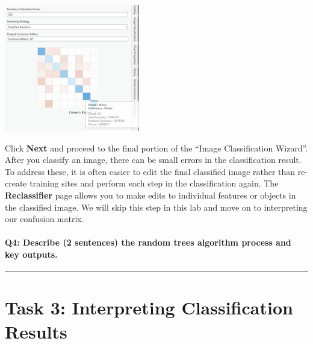 \documentclass[
]{book}
\begin{document}
\begin{center}\includegraphics[width=0.5\linewidth]{images/08-confusion-matrix} \end{center}

Click \textbf{Next} and proceed to the final portion of the ``Image Classification Wizard''. After you classify an image, there can be small errors in the classification result. To address these, it is often easier to edit the final classified image rather than re-create training sites and perform each step in the classification again. The \textbf{Reclassifier} page allows you to make edits to individual features or objects in the classified image. We will skip this step in this lab and move on to interpreting our confusion matrix.

\hypertarget{q4-describe-2-sentences-the-random-trees-algorithm-process-and-key-outputs.}{%
\paragraph*{Q4: Describe (2 sentences) the random trees algorithm process and key outputs.}\label{q4-describe-2-sentences-the-random-trees-algorithm-process-and-key-outputs.}}

\begin{center}\rule{0.5\linewidth}{0.5pt}\end{center}

\hypertarget{task-3-interpreting-classification-results}{%
\section*{Task 3: Interpreting Classification Results}\label{task-3-interpreting-classification-results}}
\end{document}
